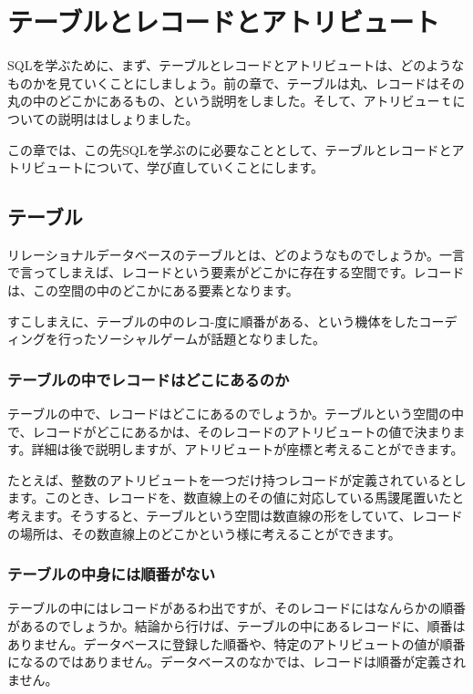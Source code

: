 \chapter{テーブルとレコードとアトリビュート}

SQLを学ぶために、まず、テーブルとレコードとアトリビュートは、どのようなものかを見ていくことにしましょう。前の章で、テーブルは丸、レコードはその丸の中のどこかにあるもの、という説明をしました。そして、アトリビューｔについての説明ははしょりました。

この章では、この先SQLを学ぶのに必要なこととして、テーブルとレコードとアトリビュートについて、学び直していくことにします。


\section{テーブル}

リレーショナルデータベースのテーブルとは、どのようなものでしょうか。一言で言ってしまえば、レコードという要素がどこかに存在する空間です。レコードは、この空間の中のどこかにある要素となります。

すこしまえに、テーブルの中のレコ-度に順番がある、という機体をしたコーディングを行ったソーシャルゲームが話題となりました。

\subsection{テーブルの中でレコードはどこにあるのか}

テーブルの中で、レコードはどこにあるのでしょうか。テーブルという空間の中で、レコードがどこにあるかは、そのレコードのアトリビュートの値で決まります。詳細は後で説明しますが、アトリビュートが座標と考えることができます。

たとえば、整数のアトリビュートを一つだけ持つレコードが定義されているとします。このとき、レコードを、数直線上のその値に対応している馬謖尾置いたと考えます。そうすると、テーブルという空間は数直線の形をしていて、レコードの場所は、その数直線上のどこかという様に考えることができます。


\subsection{テーブルの中身には順番がない}


テーブルの中にはレコードがあるわ出ですが、そのレコードにはなんらかの順番があるのでしょうか。結論から行けば、テーブルの中にあるレコードに、順番はありません。データベースに登録した順番や、特定のアトリビュートの値が順番になるのではありません。データベースのなかでは、レコードは順番が定義されません。

